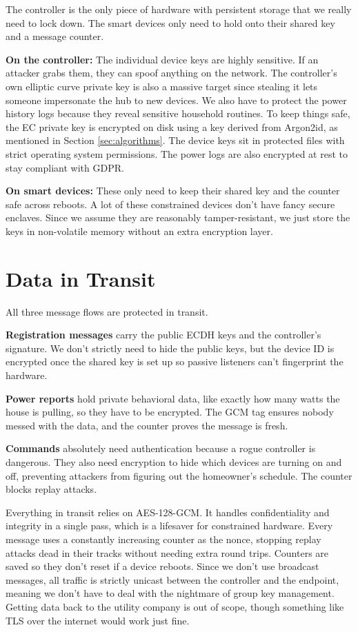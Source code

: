 \documentclass[a4paper,11pt]{article}
\begin{document}
The controller is the only piece of hardware with persistent storage that we really need to lock down. The smart devices only need to hold onto their shared key and a message counter.

\textbf{On the controller:} The individual device keys are highly sensitive. If an attacker grabs them, they can spoof anything on the network. The controller's own elliptic curve private key is also a massive target since stealing it lets someone impersonate the hub to new devices. We also have to protect the power history logs because they reveal sensitive household routines. To keep things safe, the EC private key is encrypted on disk using a key derived from Argon2id, as mentioned in Section \ref{sec:algorithms}. The device keys sit in protected files with strict operating system permissions. The power logs are also encrypted at rest to stay compliant with GDPR.

\textbf{On smart devices:} These only need to keep their shared key and the counter safe across reboots. A lot of these constrained devices don't have fancy secure enclaves. Since we assume they are reasonably tamper-resistant, we just store the keys in non-volatile memory without an extra encryption layer.

\section{Data in Transit}

All three message flows are protected in transit.

\textbf{Registration messages} carry the public ECDH keys and the controller's signature. We don't strictly need to hide the public keys, but the device ID is encrypted once the shared key is set up so passive listeners can't fingerprint the hardware.

\textbf{Power reports} hold private behavioral data, like exactly how many watts the house is pulling, so they have to be encrypted. The GCM tag ensures nobody messed with the data, and the counter proves the message is fresh.

\textbf{Commands} absolutely need authentication because a rogue controller is dangerous. They also need encryption to hide which devices are turning on and off, preventing attackers from figuring out the homeowner's schedule. The counter blocks replay attacks.

Everything in transit relies on AES-128-GCM. It handles confidentiality and integrity in a single pass, which is a lifesaver for constrained hardware. Every message uses a constantly increasing counter as the nonce, stopping replay attacks dead in their tracks without needing extra round trips. Counters are saved so they don't reset if a device reboots. Since we don't use broadcast messages, all traffic is strictly unicast between the controller and the endpoint, meaning we don't have to deal with the nightmare of group key management. Getting data back to the utility company is out of scope, though something like TLS over the internet would work just fine.
\end{document}
